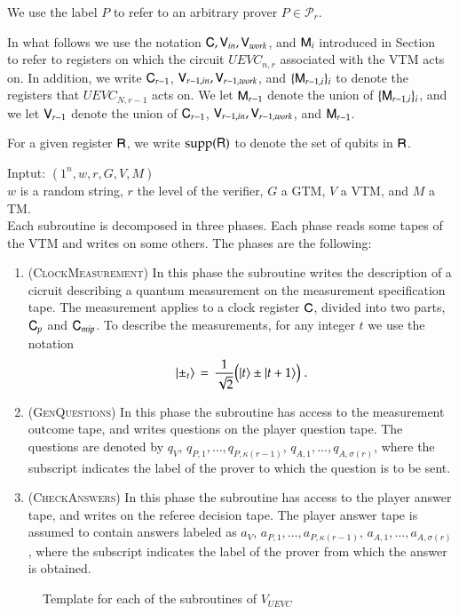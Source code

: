 We use the label $P$ to refer to an arbitrary prover $P\in\mathcal{P}_r$. 

In what follows we use the notation ${\mathsf{C}},{\mathsf{V}}_{in},{\mathsf{V}}_{work}$, and ${\mathsf{M}}_i$ introduced in Section~\label{sec:specs} to refer to registers on which the circuit $UEVC_{n,r}$ associated with the VTM acts on. In addition, we write ${\mathsf{C}}_{r-1}$, ${\mathsf{V}}_{r-1,in},{\mathsf{V}}_{r-1,work}$, and $\{ {\mathsf{M}}_{r-1,i} \}_i$ to denote the registers that $UEVC_{N,r-1}$ acts on. We let ${\mathsf{M}}_{r-1}$ denote the union of $\{ {\mathsf{M}}_{r-1,i} \}_i$, and we let ${\mathsf{V}}_{r-1}$ denote the union of ${\mathsf{C}}_{r-1}$, ${\mathsf{V}}_{r-1,in},{\mathsf{V}}_{r-1,work}$, and ${\mathsf{M}}_{r-1}$. 

For a given register ${\mathsf{R}}$, we write $\operatorname{supp}({\mathsf{R}})$ to denote the set of qubits in ${\mathsf{R}}$.






\vspace{10pt}
\begin{center}
\begin{mdframed}
Inptut: $(1^n,w,r,G,V,M)$\\
  $w$ is a random string, $r$ the level of the verifier, $G$ a GTM, $V$ a VTM, and $M$ a TM.\\
Each subroutine is decomposed in three phases. Each phase reads some tapes of the VTM and writes on some others. The phases are the following: 
	\begin{enumerate}
		\item (\textsc{ClockMeasurement}) In this phase the subroutine writes the description of a cicruit describing a quantum measurement on the measurement specification tape. The measurement applies to a clock register ${\mathsf{C}}$, divided into two parts, ${\mathsf{C}}_{p}$ and ${\mathsf{C}}_{mip}$. To describe the measurements, for any integer $t$ we use the notation 
$$|\pm_t\rangle \,=\, \frac{1}{\sqrt{2}}\big(|t\rangle\pm|t+1\rangle\big)\;.$$
	\item (\textsc{GenQuestions}) In this phase the subroutine has access to the measurement outcome tape, and writes questions on the player question tape. The questions are denoted  by $q_V$, $q_{P,1},\ldots,q_{P,\kappa(r-1)}$, $q_{A,1},\ldots,q_{A,\sigma(r)}$, where the subscript indicates the label of the prover to which the question is to be sent. 
		\item (\textsc{CheckAnswers}) In this phase the subroutine has access to the player answer tape, and writes on the referee decision tape. The player answer tape is assumed to contain answers labeled as $a_V$, $a_{P,1},\ldots,a_{P,\kappa(r-1)}$, $a_{A,1},\ldots,a_{A,\sigma(r)}$, where the subscript indicates the label of the prover from which the answer is obtained.
	\end{enumerate}    
\end{mdframed}

\end{center}
\begin{figure}[H]
\caption{Template for each of the subroutines of $V_{UEVC}$}
\label{fig:check_structure}
\end{figure}





